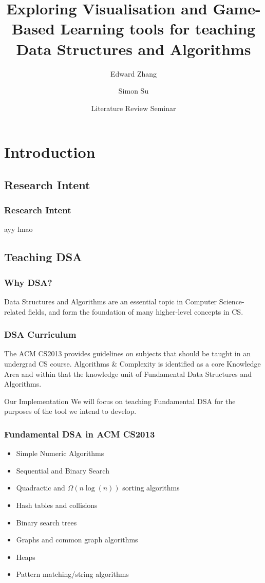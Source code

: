 \documentclass{beamer}
\title[Visualisation and GBL for DSA teaching] %
{Exploring Visualisation and Game-Based Learning tools for teaching Data Structures and Algorithms}
\author{Edward Zhang \and Simon Su}
\institute[UoA] %
{
  Department of ECSE\\
  The University of Auckland
}
\date[May 2019] %
{Literature Review Seminar}
\begin{document}
\frame{\titlepage}
\section{Introduction}
\subsection{Research Intent}
\begin{frame}
  \frametitle{Research Intent}
  ayy lmao
\end{frame}
\subsection{Teaching DSA}
\begin{frame}
  \frametitle{Why DSA?}
  Data Structures and Algorithms are an essential topic in Computer Science-related fields, and form the foundation of many higher-level concepts in CS.
\end{frame}
\begin{frame}
  \frametitle{DSA Curriculum}
  The ACM CS2013 provides guidelines on subjects that should be taught in an undergrad CS course. Algorithms \& Complexity is identified as a core Knowledge Area and within that the knowledge unit of Fundamental Data Structures and Algorithms.
  \pause
  \begin{block}{Our Implementation}
  We will focus on teaching Fundamental DSA for the purposes of the tool we intend to develop.
  \end{block}
\end{frame}
\begin{frame}
  \frametitle{Fundamental DSA in ACM CS2013}
  \begin{itemize}
    \item Simple Numeric Algorithms
    \item Sequential and Binary Search
    \item Quadractic and $\Omega(n\log(n))$ sorting algorithms
    \item Hash tables and collisions
    \item Binary search trees
    \item Graphs and common graph algorithms
    \item Heaps
    \item Pattern matching/string algorithms
  \end{itemize}
\end{frame}
\end{document}
